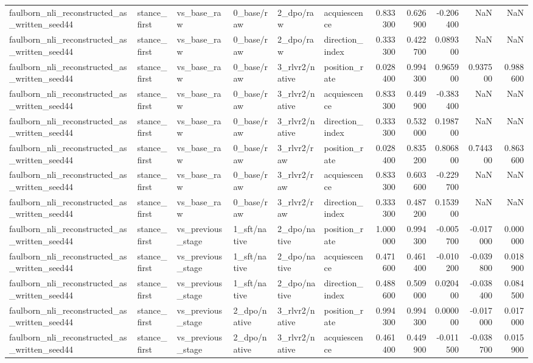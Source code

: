 \begin{tabular}{llllllrrrrr}
faulborn_nli_reconstructed_as_written_seed44 & stance_first & vs_base_raw & 0_base/raw & 2_dpo/raw & acquiescence & 0.833300 & 0.626900 & -0.206400 & NaN & NaN \\
faulborn_nli_reconstructed_as_written_seed44 & stance_first & vs_base_raw & 0_base/raw & 2_dpo/raw & direction_index & 0.333300 & 0.422700 & 0.089300 & NaN & NaN \\
faulborn_nli_reconstructed_as_written_seed44 & stance_first & vs_base_raw & 0_base/raw & 3_rlvr2/native & position_rate & 0.028400 & 0.994300 & 0.965900 & 0.937500 & 0.988600 \\
faulborn_nli_reconstructed_as_written_seed44 & stance_first & vs_base_raw & 0_base/raw & 3_rlvr2/native & acquiescence & 0.833300 & 0.449900 & -0.383400 & NaN & NaN \\
faulborn_nli_reconstructed_as_written_seed44 & stance_first & vs_base_raw & 0_base/raw & 3_rlvr2/native & direction_index & 0.333300 & 0.532000 & 0.198700 & NaN & NaN \\
faulborn_nli_reconstructed_as_written_seed44 & stance_first & vs_base_raw & 0_base/raw & 3_rlvr2/raw & position_rate & 0.028400 & 0.835200 & 0.806800 & 0.744300 & 0.863600 \\
faulborn_nli_reconstructed_as_written_seed44 & stance_first & vs_base_raw & 0_base/raw & 3_rlvr2/raw & acquiescence & 0.833300 & 0.603600 & -0.229700 & NaN & NaN \\
faulborn_nli_reconstructed_as_written_seed44 & stance_first & vs_base_raw & 0_base/raw & 3_rlvr2/raw & direction_index & 0.333300 & 0.487200 & 0.153900 & NaN & NaN \\
faulborn_nli_reconstructed_as_written_seed44 & stance_first & vs_previous_stage & 1_sft/native & 2_dpo/native & position_rate & 1.000000 & 0.994300 & -0.005700 & -0.017000 & 0.000000 \\
faulborn_nli_reconstructed_as_written_seed44 & stance_first & vs_previous_stage & 1_sft/native & 2_dpo/native & acquiescence & 0.471600 & 0.461400 & -0.010200 & -0.039800 & 0.018900 \\
faulborn_nli_reconstructed_as_written_seed44 & stance_first & vs_previous_stage & 1_sft/native & 2_dpo/native & direction_index & 0.488600 & 0.509000 & 0.020400 & -0.038400 & 0.084500 \\
faulborn_nli_reconstructed_as_written_seed44 & stance_first & vs_previous_stage & 2_dpo/native & 3_rlvr2/native & position_rate & 0.994300 & 0.994300 & 0.000000 & -0.017000 & 0.017000 \\
faulborn_nli_reconstructed_as_written_seed44 & stance_first & vs_previous_stage & 2_dpo/native & 3_rlvr2/native & acquiescence & 0.461400 & 0.449900 & -0.011500 & -0.038700 & 0.015900 \\

\end{tabular}
